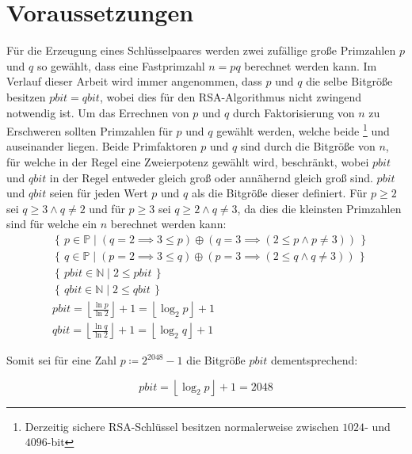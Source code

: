 \section{Voraussetzungen}

Für die Erzeugung eines Schlüsselpaares werden zwei zufällige große Primzahlen $p$ und $q$ so gewählt, dass eine Fastprimzahl $n=pq$ berechnet werden kann. Im Verlauf dieser Arbeit wird immer angenommen, dass $p$ und $q$ die selbe Bitgröße besitzen $pbit=qbit$, wobei dies für den RSA-Algorithmus nicht zwingend notwendig ist.
Um das Errechnen von $p$ und $q$ durch Faktorisierung von $n$ zu Erschweren sollten Primzahlen für $p$ und $q$ gewählt werden, welche beide \footnote{Derzeitig sichere RSA-Schlüssel besitzen normalerweise zwischen $1024$- und $4096$-bit} und  auseinander liegen.
Beide Primfaktoren $p$ und $q$ sind durch die Bitgröße von $n$, für welche in der Regel eine Zweierpotenz gewählt wird, beschränkt, wobei $pbit$ und $qbit$ in der Regel entweder gleich groß oder annähernd gleich groß sind. $pbit$ und $qbit$ seien für jeden Wert $p$ und $q$ als die Bitgröße dieser definiert.
Für $p\ge2$ sei $q\ge3 \land q\ne2$ und für $p\ge3$ sei $q\ge2 \land q\ne3$, da dies die kleinsten Primzahlen sind für welche ein $n$ berechnet werden kann:
\begin{equation}
  \begin{split}
    &\left\{\,p \in \mathbb{P}\mid (q=2 \implies 3 \le p) \oplus (q=3 \implies (2 \le p \land p \ne 3))\, \right\}\\
    &\left\{\,q \in \mathbb{P}\mid (p=2 \implies 3 \le q) \oplus (p=3 \implies (2 \le q \land q \ne 3))\, \right\}\\
    &\left\{\,pbit \in \mathbb{N}\mid 2 \le pbit\, \right\}\\
    &\left\{\,qbit \in \mathbb{N}\mid 2 \le qbit\, \right\}\\
    &pbit=\left\lfloor\frac{\ln{p}}{\ln{2}}\right\rfloor+1=\left\lfloor\log_2{p}\right\rfloor+1\\
    &qbit=\left\lfloor\frac{\ln{q}}{\ln{2}}\right\rfloor+1=\left\lfloor\log_2{q}\right\rfloor+1
  \end{split}
\end{equation}

Somit sei für eine Zahl $p\coloneq2^{2048}-1$ die Bitgröße $pbit$ dementsprechend:

\begin{equation}
  pbit=\left\lfloor\log_2{p}\right\rfloor+1=2048
\end{equation}

